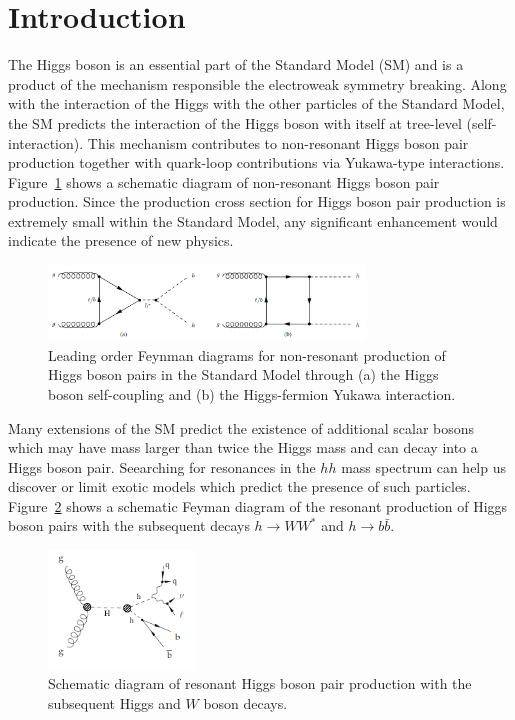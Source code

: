 \section{Introduction}
\label{sec:dihiggs_intro}
The Higgs boson is an essential part of the Standard Model (SM) and is a product of the mechanism responsible the electroweak symmetry breaking. Along with the interaction of the Higgs with the other particles of the Standard Model, the SM predicts the interaction of the Higgs boson with itself at tree-level (self-interaction). This mechanism contributes to non-resonant Higgs boson pair production together with quark-loop contributions via Yukawa-type interactions. Figure~\ref{fig:nr_hh_production} shows a schematic diagram of non-resonant Higgs boson pair production. Since the production cross section for Higgs boson pair production is extremely small within the Standard Model, any significant enhancement would indicate the presence of new physics.

\begin{figure}[!h] 
\begin{center}
\includegraphics*[width=0.75\textwidth] {chapters/dihiggs/figures/nr-diHiggs-production.png}
\caption{Leading order Feynman diagrams for non-resonant production of Higgs
  boson pairs in the Standard Model through (a) the Higgs boson self-coupling
  and (b) the Higgs-fermion Yukawa interaction.} 
  \label{fig:nr_hh_production}
\end{center}
\end{figure}

Many extensions of the SM predict the existence of additional scalar bosons which may have mass larger than twice the Higgs mass and can decay into a Higgs boson pair. Seearching for resonances in the $hh$ mass spectrum can help us discover or limit exotic models which predict the presence of such particles. Figure~\ref{fig:resonant_hh_production} shows a schematic Feyman diagram of the resonant production of Higgs boson pairs with the subsequent decays $h \to WW^{\ast}$ and $h \to b \bar{b}$.

\begin{figure}[!h] 
\begin{center}
\includegraphics*[width=0.35\textwidth] {chapters/dihiggs/figures/resonant-diHiggs-production.png}
  \caption{Schematic diagram of resonant Higgs boson pair production with the
    subsequent Higgs and $W$ boson decays.}
  \label{fig:resonant_hh_production}
\end{center}
\end{figure}

